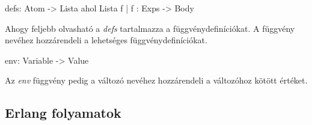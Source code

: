 defs: Atom -> Lista ahol Lista {f | f : Exps -> Body}

Ahogy feljebb olvasható a \textit{defs} tartalmazza a függvénydefiníciókat. A függvény nevéhez hozzárendeli a lehetséges függvénydefiníciókat.

env: Variable -> Value

Az \textit{env} függvény pedig a változó nevéhez hozzárendeli a változóhoz kötött értéket.


\subsection{Erlang folyamatok}
